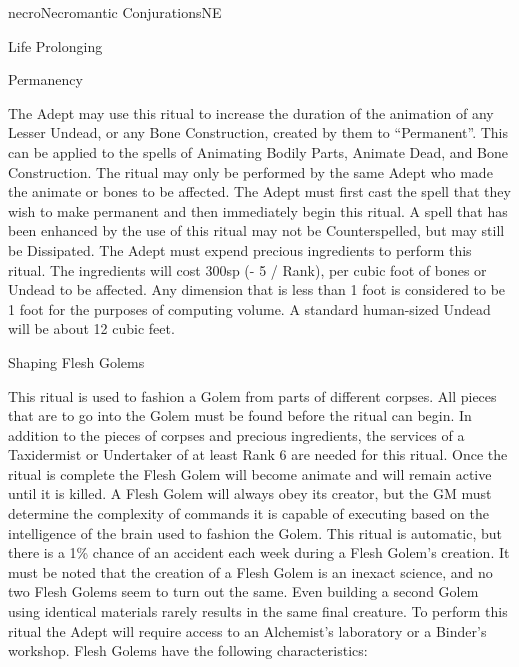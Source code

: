 \begin{college}[1.1]{necro}{Necromantic Conjurations}{NE}
\begin{ritual}[R-2]{Life Prolonging}
\begin{effects}
\end{effects}
\end{ritual}

\begin{ritual}[R-3]{Permanency}

\begin{effects}
The Adept may use this ritual to increase the duration of the
animation of any Lesser Undead, or any Bone Construction, created by
them to ``Permanent''.  This can be applied to the spells of Animating
Bodily Parts, Animate Dead, and Bone Construction.  The ritual may
only be performed by the same Adept who made the animate or bones to
be affected.  The Adept must first cast the spell that they wish to
make permanent and then immediately begin this ritual.  A spell that
has been enhanced by the use of this ritual may not be Counterspelled,
but may still be Dissipated.  The Adept must expend precious
ingredients to perform this ritual.  The ingredients will cost 300sp
(- 5 / Rank), per cubic foot of bones or Undead to be affected.  Any
dimension that is less than 1 foot is considered to be 1 foot for the
purposes of computing volume.  A standard human-sized Undead will be
about 12 cubic feet.
\end{effects}
\end{ritual}

\begin{ritual}[R-4]{Shaping Flesh Golems}

\begin{effects}
This ritual is used to fashion a Golem from parts of different
corpses.  All pieces that are to go into the Golem must be found
before the ritual can begin.  In addition to the pieces of corpses and
precious ingredients, the services of a Taxidermist or Undertaker of
at least Rank 6 are needed for this ritual.  Once the ritual is
complete the Flesh Golem will become animate and will remain active
until it is killed.  A Flesh Golem will always obey its creator, but
the GM must determine the complexity of commands it is capable of
executing based on the intelligence of the brain used to fashion the
Golem.  This ritual is automatic, but there is a 1\% chance of an
accident each week during a Flesh Golem's creation.  It must be noted
that the creation of a Flesh Golem is an inexact science, and no two
Flesh Golems seem to turn out the same.  Even building a second Golem
using identical materials rarely results in the same final creature.
To perform this ritual the Adept will require access to an Alchemist's
laboratory or a Binder's workshop.  Flesh Golems have the following
characteristics:


\end{effects}
\end{ritual}
\end{college}
